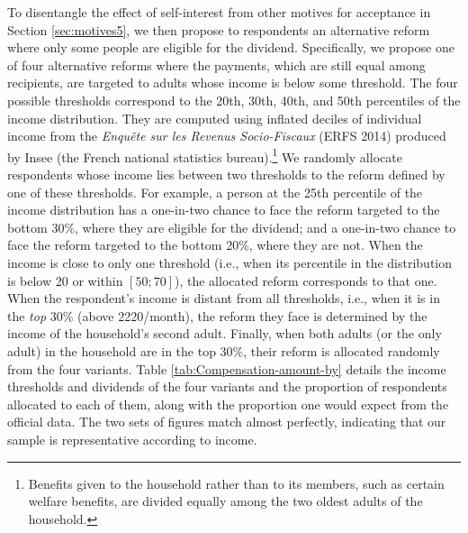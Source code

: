 \documentclass[12pt]{article} %
\begin{document}
To disentangle the effect of self-interest from other motives for acceptance in Section \ref{sec:motives5}, we then propose to respondents an alternative reform where only some people are eligible for the dividend. Specifically, we propose one of four alternative reforms where the payments, which are still equal among recipients, are targeted to adults whose income is below some threshold. The four possible thresholds correspond to the 20th, 30th, 40th, and 50th percentiles of the income distribution. They are computed using inflated deciles of individual income from the \emph{Enquête sur les Revenus Socio-Fiscaux} (ERFS 2014) produced by Insee (the French national statistics bureau).\footnote{Benefits given to the household rather than to its members, such as certain welfare benefits, are divided equally among the two oldest adults of the household.} We randomly allocate respondents whose income lies between two thresholds to the reform defined by one of these thresholds. For example, a person at the 25th percentile of the income distribution has a one-in-two chance to face the reform targeted to the bottom 30\%, where they are eligible for the dividend; and a one-in-two chance to face the reform targeted to the bottom 20\%, where they are not. When the income is close to only one threshold (i.e., when its percentile in the distribution is below 20 or within $\left[50;70\right]$), the allocated reform corresponds to that one. When the respondent's income is distant from all thresholds, i.e., when it is in the \textit{top} 30\% (above 2220\euros{}/month), the reform they face is determined by the income of the household's second adult. Finally, when both adults (or the only adult) in the household are in the top 30\%, their reform is allocated randomly from the four variants. Table \ref{tab:Compensation-amount-by} details the income thresholds and dividends of the four variants and the proportion of respondents allocated to each of them, along with the proportion one would expect from the official data. The two sets of figures match almost perfectly, indicating that our sample is representative according to income.
\end{document}
